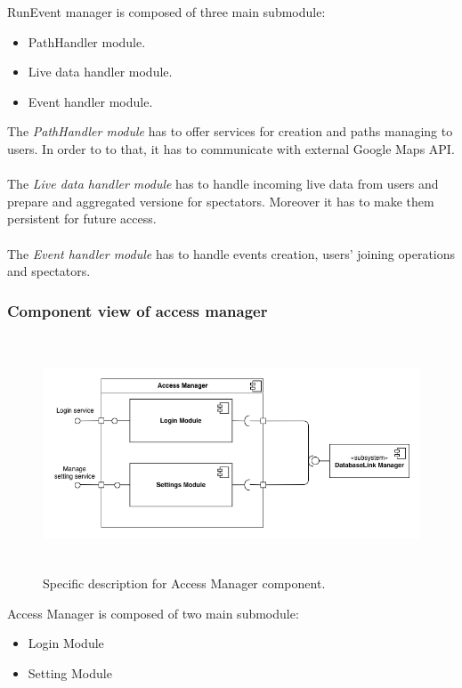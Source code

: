 \documentclass[DD.tex]{subfiles}
\begin{document}
RunEvent manager is composed of three main submodule: \begin{itemize}
	\item PathHandler module.
	\item Live data handler module.
	\item Event handler module.
\end{itemize}

The \textit{PathHandler module} has to offer services for creation and paths managing to users. In order to to that, it has to communicate with external Google Maps API.\\\\
The \textit{Live data handler module} has to handle incoming live data from users and prepare and aggregated versione for spectators. Moreover it has to make them persistent for future access.\\\\
The \textit{Event handler module} has to handle events creation, users' joining operations and spectators.

\newpage
\subsubsection{Component view of access manager}
\begin{figure}[h!]
	\centering
	\includegraphics[height=7.00cm,keepaspectratio]{Figures/AccessManagerComponent}
	\caption{Specific description for Access Manager component.}
\end{figure}

Access Manager is composed of two main submodule: 
\begin{itemize}
	\item Login Module
	\item Setting Module
\end{itemize}
\end{document}
